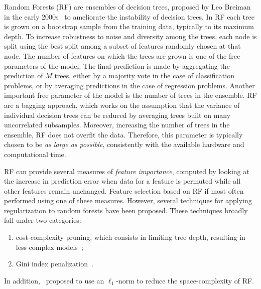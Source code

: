 	    Random Forests (\ac{RF}) are ensembles of decision trees, proposed by Leo Breiman in the early 2000s~\cite{breiman2001random} to ameliorate the instability of decision trees.
	    In RF each tree is grown on a bootstrap sample from the training data, typically to its maximum depth.
	    To increase robustness to noise and diversity among the trees, each node is split using the best split among a subset of features randomly chosen at that node. The number of features on which the trees are grown is one of the free parameters of the model.
	    The final prediction is made by aggregating the prediction of $M$ trees, either by a majority vote in the case of classification problems, or by averaging predictions in the case of regression problems.
	    Another important free parameter of the model is the number of trees in the ensemble.
	    RF are a bagging approach, which works on the assumption that the variance of individual decision trees can be reduced by averaging trees built on many uncorrelated subsamples.
	    Moreover, increasing the number of trees in the ensemble, RF does not overfit the data. Therefore, this parameter is typically chosen to be \textit{as large as possible}, consistently with the available hardware and computational time.

	    RF can provide several measures of \textit{feature importance}, computed by looking at the increase in prediction error %
	    when data for a feature is permuted while all other features remain unchanged. 
	    Feature selection based on RF if most often performed using one of these measures. However, several techniques for applying regularization to random forests have been proposed. These techniques broadly fall under two categories:
	    \begin{enumerate}
			\item cost-complexity pruning, which consists in limiting tree depth, resulting in less complex models~\cite{ishwaran2008random,kulkarni2012pruning};
			\item Gini index penalization~\cite{deng2013gene, liu2014learning}.
	    \end{enumerate}
    	In addition,~\cite{joly2012ell1} proposed to use an $\ell_1$-norm  to reduce the space-complexity of RF.

